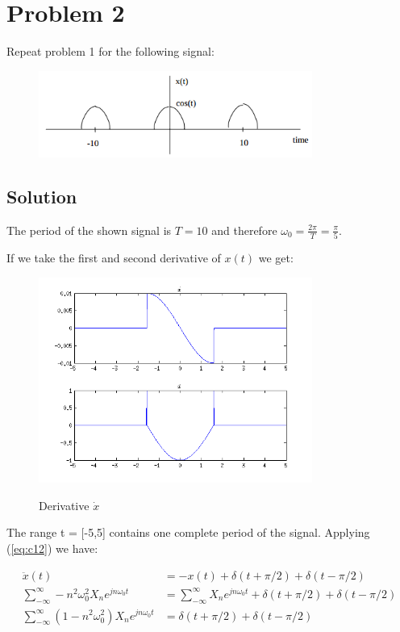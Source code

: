 \section*{Problem 2}
Repeat problem 1 for the following signal:

\begin{figure}[H]
\caption*{}
\centering
\includegraphics[width=0.8\textwidth]{figs/c1p2.png}
\label{fig:c1p2}
\end{figure} 

\subsection*{Solution}
The period of the shown signal is $T=10$ and therefore $\omega_0 = \frac{2 \pi}{T} =  \frac{\pi}{5}$.

If we take the first and second derivative of $x(t)$ we get:

\begin{figure}[H]
\caption{Derivative $\dot{x}$}
\centering
\includegraphics[width=0.8\textwidth]{figs/c1p2a.png}
\label{fig:c1p2a}
\end{figure} 

The range t = [-5,5] contains one complete period of the signal.
Applying (\ref{eq:c12}) we have:

\begin{equation*}
\begin{aligned}
\ddot{x}(t) &= - x(t) + \delta(t+\pi/2) + \delta(t-\pi/2)\\
\displaystyle\sum_{- \infty}^{\infty} - n^2 \omega_0^2 X_n e^{j n \omega_0 t} &=
\displaystyle\sum_{- \infty}^{\infty} X_n e^{j n \omega_0 t} + 
\delta(t+\pi/2) + \delta(t-\pi/2) \\
\displaystyle\sum_{- \infty}^{\infty} (1 - n^2 \omega_0^2) X_n e^{j n \omega_0 t} &=
\delta(t+\pi/2) + \delta(t-\pi/2) \\
\end{aligned}
\end{equation*} 

